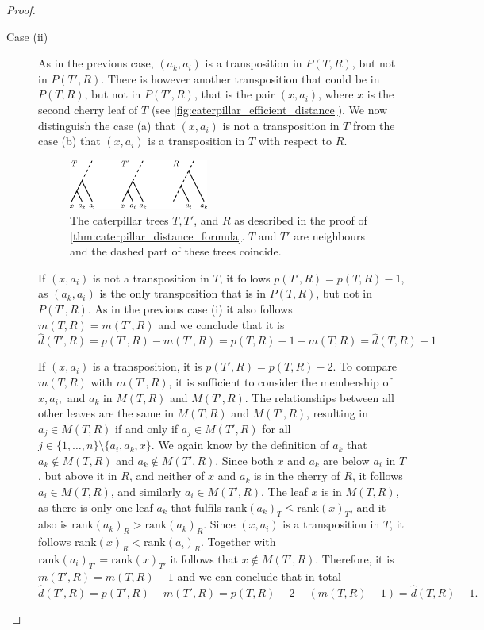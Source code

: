 \documentclass[11pt]{amsart}
\newcommand{\rank}{\mathrm{rank}}
\begin{document}
\begin{proof}
\begin{description}
		\item[Case (ii)]
			As in the previous case, $(a_k,a_i)$ is a transposition in $P(T,R)$, but not in $P(T',R)$.
			There is however another transposition that could be in $P(T,R)$, but not in $P(T',R)$, that is the pair $(x,a_i)$, where $x$ is the second cherry leaf of $T$ (see \autoref{fig:caterpillar_efficient_distance}).
			We now distinguish the case (a) that $(x,a_i)$ is not a transposition in $T$ from the case (b) that $(x,a_i)$ is a transposition in $T$ with respect to $R$.
			\begin{figure}[ht]
				\includegraphics[width=0.45\textwidth]{caterpillar_efficient_distance.eps}
				\caption{The caterpillar trees $T,T'$, and $R$ as described in the proof of \autoref{thm:caterpillar_distance_formula}. $T$ and $T'$ are neighbours and the dashed part of these trees coincide.}
				\label{fig:caterpillar_efficient_distance}
			\end{figure}

			If $(x,a_i)$ is not a transposition in $T$, it follows $p(T',R) = p(T,R) - 1$, as $(a_k,a_i)$ is the only transposition that is in $P(T,R)$, but not in $P(T',R)$.
			As in the previous case (i) it also follows $m(T,R) = m(T',R)$ and we conclude that it is
			\[\widehat d(T',R) = p(T',R) - m(T',R) = p(T,R) - 1 - m(T,R) = \widehat d(T,R) - 1\]

			If $(x,a_i)$ is a transposition, it is $p(T',R) = p(T,R) - 2$.
			To compare $m(T,R)$ with $m(T',R)$, it is sufficient to consider the membership of $x,a_i,$ and $a_k$ in $M(T,R)$ and $M(T',R)$.
			The relationships between all other leaves are the same in $M(T,R)$ and $M(T',R)$, resulting in $a_j \in M(T,R)$ if and only if $a_j \in M(T',R)$ for all $j \in \{1, \ldots,n \} \setminus \{a_i, a_k, x\}$.
			We again know by the definition of $a_k$ that $a_k \notin M(T,R)$ and $a_k \notin M(T',R)$.
			Since both $x$ and $a_k$ are below $a_i$ in $T$, but above it in $R$, and neither of $x$ and $a_k$ is in the cherry of $R$, it follows $a_i \in M(T,R)$, and similarly $a_i \in M(T',R)$.
			The leaf $x$ is in $M(T,R)$, as there is only one leaf $a_k$ that fulfils $\rank(a_k)_T \leq \rank(x)_T$, and it also is $\rank(a_k)_R > \rank(a_k)_R$.
			Since $(x,a_i)$ is a transposition in $T$, it follows $\rank(x)_R < \rank(a_i)_R$.
			Together with $\rank(a_i)_{T'} = \rank(x)_{T'}$ it follows that $x \notin M(T',R)$.
			Therefore, it is $m(T',R) = m(T,R) - 1$ and we can conclude that in total
			\[\widehat d(T',R) = p(T',R) - m(T',R) = p(T,R) - 2 - (m(T,R)-1) = \widehat d(T,R) - 1.\]
	\end{description}
\end{proof}
\end{document}
